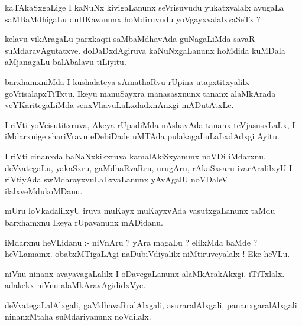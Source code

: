 \documentclass{article}
\begin{document}
\begin{mn}
kaTAkaSxgaLige I kaNuNx kivigaLanunx  seVrisuvudu  yukatxvalalx avugaLa 
saMBaMdhigaLu duHKavanunx hoMdiruvudu  yoVgayxvalalxvaSeTx ?

\end{mn}

\begin{mn}
kelavu  vikAragaLu  parxkaqti saMbaMdhavAda  guNagaLiMda savaR suMdaravAgutatxve.  
doDaDxdAgiruva kaNuNxgaLanunx  hoMdida kuMDala aMjanagaLu balAbalavu tiLiyitu.
\end{mn}

\begin{mn}
barxhamxniMda I kushalateya sAmathaRvu rUpina utapxtitxyalilx goVrisalapxTiTxtu.  Ikeyu manuSayxra 
manasasxnunx tananx alaMkArada  veYKaritegaLiMda senxVhavuLaLxdadxnAnxgi mADutAtxLe.
\end{mn}

\begin{mn}
I riVti yoVcisutitxruva, Akeya rUpadiMda nAshavAda  tananx  teVjasusxLaLx, 
I iMdarxnige  shariVravu eDebiDade  uMTAda  pulakagaLuLaLxdAdxgi Ayitu.
\end{mn}

\begin{mn}
I riVti cinanxda baNaNxkikxruva kamalAkiSxyanunx noVDi iMdarxnu, deVvategaLu,  
yakaSxru, gaMdhaRvaRru,  urugAru,  rAkaSxsaru ivarAralilxyU I riVtiyAda 
swMdarayxvuLaLxvaLanunx  yAvAgalU  noVDaleV ilalxveMdukoMDanu.
\end{mn}

\begin{mn}
mUru loVkadalilxyU iruva muKayx muKayxvAda vasutxgaLanunx taMdu barxhamxnu Ikeya rUpavanunx mADidanu.
\end{mn}

\begin{mn}
iMdarxnu heVLidanu :- niVnAru ?  yAra magaLu ?  elilxMda baMde ?  heVLamamx. 
obabxMTigaLAgi naDubiVdiyalilx niMtiruveyalalx !  Eke heVLu.
\end{mn}

\begin{mn}
niVnu ninanx avayavagaLalilx I oDavegaLanunx  alaMkArakAkxgi. iTiTxlalx.  adakekx niVnu alaMkAravAgididxVye.
\end{mn}

\begin{mn}
deVvategaLalAlxgali, gaMdhavaRralAlxgali, asuraralAlxgali,  pananxgaralAlxgali  
ninanxMtaha suMdariyanunx noVdilalx.
\end{mn}
\end{document}
